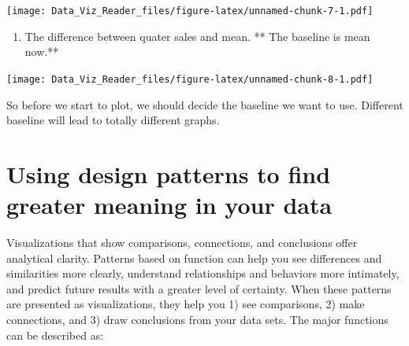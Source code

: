 \documentclass[]{book}
\newenvironment{Shaded}{\begin{snugshade}}{\end{snugshade}}
\newcommand{\KeywordTok}[1]{\textcolor[rgb]{0.13,0.29,0.53}{\textbf{#1}}}
\newcommand{\DataTypeTok}[1]{\textcolor[rgb]{0.13,0.29,0.53}{#1}}
\newcommand{\DecValTok}[1]{\textcolor[rgb]{0.00,0.00,0.81}{#1}}
\newcommand{\StringTok}[1]{\textcolor[rgb]{0.31,0.60,0.02}{#1}}
\newcommand{\CommentTok}[1]{\textcolor[rgb]{0.56,0.35,0.01}{\textit{#1}}}
\newcommand{\OtherTok}[1]{\textcolor[rgb]{0.56,0.35,0.01}{#1}}
\newcommand{\ControlFlowTok}[1]{\textcolor[rgb]{0.13,0.29,0.53}{\textbf{#1}}}
\newcommand{\OperatorTok}[1]{\textcolor[rgb]{0.81,0.36,0.00}{\textbf{#1}}}
\newcommand{\NormalTok}[1]{#1}
\providecommand{\tightlist}{%
  \setlength{\itemsep}{0pt}\setlength{\parskip}{0pt}}
\theoremstyle{definition}
\theoremstyle{definition}
\theoremstyle{definition}
\theoremstyle{remark}
\begin{document}
\texttt{[image: Data\_Viz\_Reader\_files/figure-latex/unnamed-chunk-7-1.pdf]}

\begin{enumerate}
\def\labelenumi{\arabic{enumi}.}
\setcounter{enumi}{4}
\tightlist
\item
  The difference between quater sales and mean. ** The baseline is mean
  now.**
\end{enumerate}

\begin{Shaded}
\end{Shaded}

\texttt{[image: Data\_Viz\_Reader\_files/figure-latex/unnamed-chunk-8-1.pdf]}

So before we start to plot, we should decide the baseline we want to
use. Different baseline will lead to totally different graphs.

\section{Using design patterns to find greater meaning in your
data}\label{using-design-patterns-to-find-greater-meaning-in-your-data}

Visualizations that show comparisons, connections, and conclusions offer
analytical clarity. Patterns based on function can help you see
differences and similarities more clearly, understand relationships and
behaviors more intimately, and predict future results with a greater
level of certainty. When these patterns are presented as visualizations,
they help you 1) see comparisons, 2) make connections, and 3) draw
conclusions from your data sets. The major functions can be described
as:
\end{document}
